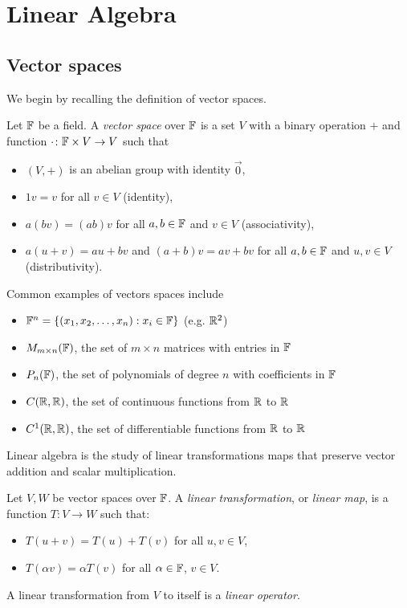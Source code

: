 \chapter{Linear Algebra}

\section{Vector spaces}

We begin by recalling the definition of vector spaces.

\begin{definition}
  Let $\mathbb{F}$ be a field. A \emph{vector space} over $\mathbb{F}$ is a set $V$ with a binary operation $+$ and function $\cdot \colon \mathbb{F} \times V \to V$ such that
  \begin{itemize}
    \item $(V, +)$ is an abelian group with identity $\vec{0}$,
    \item $1v = v$ for all $v \in V$ (identity),
    \item $a(bv) = (ab)v$ for all $a, b \in \mathbb{F}$ and $v \in V$ (associativity),
    \item $a(u + v) = au + bv$ and $(a+b)v = av + bv$ for all $a, b \in \mathbb{F}$ and $u, v \in V$ (distributivity).
  \end{itemize}
\end{definition}

\begin{example}
  Common examples of vectors spaces include
  \begin{itemize}
    \item $\mathbb{F}^{n} = \{(x_1, x_2, \dots, x_n) : x_i \in \mathbb{F}\}$ (e.g. $\mathbb{R}^2$)
    \item $M_{m\times n}(\mathbb{F})$, the set of $m\times n$ matrices with entries in $\mathbb{F}$
    \item $P_n(\mathbb{F})$, the set of polynomials of degree $n$ with coefficients in  $\mathbb{F}$ 
    \item $C(\mathbb{R}, \mathbb{R})$, the set of continuous functions from $\mathbb{R}$ to $\mathbb{R}$ 
    \item $C^1(\mathbb{R}, \mathbb{R})$, the set of differentiable functions from $\mathbb{R}$ to $\mathbb{R}$
  \end{itemize}
\end{example}

Linear algebra is the study of linear transformations \Emdash maps that preserve vector addition and scalar multiplication.

\begin{definition}
  Let $V, W$ be vector spaces over $\mathbb{F}$. A \emph{linear transformation}, or \emph{linear map}, is a function $T\colon V \to W$ such that:
  \begin{itemize}
    \item $T(u + v) = T(u) + T(v)$ for all  $u, v \in V$,
    \item $T(\alpha v) = \alpha T(v)$ for all  $\alpha \in \mathbb{F}$, $v \in V$.
  \end{itemize}
  A linear transformation from $V$ to itself is a \emph{linear operator}.
\end{definition}

